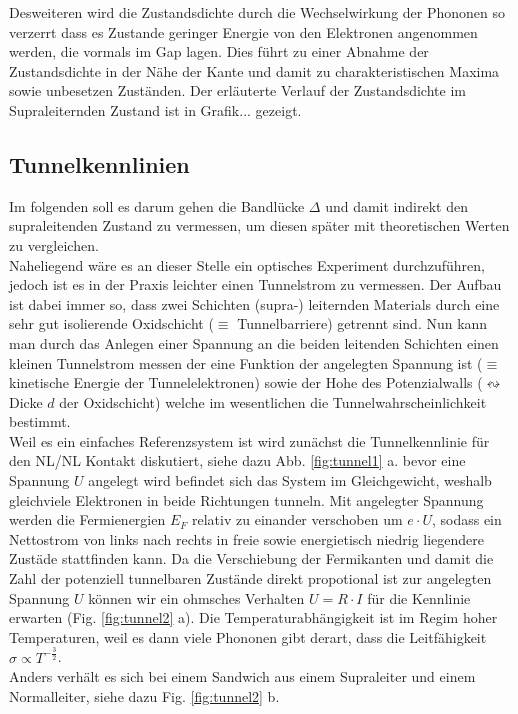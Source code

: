 \documentclass[twoside,        %
               BCOR12mm,       %
               english,ngerman, %
               fleqn,headsepline=false,footsepline=false
              ]{MFPREPORT}
\begin{document}
Desweiteren wird die Zustandsdichte durch die Wechselwirkung der Phononen so verzerrt dass es Zustande geringer Energie von den Elektronen angenommen werden, die vormals im Gap lagen. 
Dies führt zu einer Abnahme der Zustandsdichte in der Nähe der Kante und damit zu charakteristischen Maxima sowie unbesetzen Zuständen.
Der erläuterte Verlauf der Zustandsdichte im Supraleiternden Zustand ist in Grafik... gezeigt.

\subsection{Tunnelkennlinien}

Im folgenden soll es darum gehen die Bandlücke $\Delta$ und damit indirekt den supraleitenden Zustand zu vermessen, um diesen später mit theoretischen Werten zu vergleichen.
\\
Naheliegend wäre es an dieser Stelle ein optisches Experiment durchzuführen, jedoch ist es in der Praxis leichter einen Tunnelstrom zu vermessen.
Der Aufbau ist dabei immer so, dass zwei Schichten (supra-) leiternden Materials durch eine sehr gut isolierende Oxidschicht ($\equiv $ Tunnelbarriere) getrennt sind. 
Nun kann man durch das Anlegen einer Spannung an die beiden leitenden Schichten einen kleinen Tunnelstrom messen der eine Funktion der angelegten Spannung ist ($\equiv$ kinetische Energie der Tunnelelektronen) sowie der Hohe des Potenzialwalls ($\leftrightsquigarrow$ Dicke $d$ der Oxidschicht) welche im wesentlichen die Tunnelwahrscheinlichkeit bestimmt.
\\
Weil es ein einfaches Referenzsystem ist wird zunächst die Tunnelkennlinie für den NL/NL Kontakt diskutiert, siehe dazu Abb. \ref{fig:tunnel1} a.
bevor eine Spannung $U$ angelegt wird befindet sich das System im Gleichgewicht, weshalb gleichviele Elektronen in beide Richtungen tunneln.
Mit angelegter Spannung werden die Fermienergien $E_F$ relativ zu einander verschoben um $e \cdot U$, sodass ein Nettostrom von links nach rechts in freie sowie energietisch niedrig liegendere Zustäde stattfinden kann. 
Da die Verschiebung der Fermikanten und damit die Zahl der potenziell tunnelbaren Zustände direkt propotional ist zur angelegten Spannung $U$ können wir ein ohmsches Verhalten $U= R \cdot I$ für die Kennlinie erwarten (Fig. \ref{fig:tunnel2} a).
Die Temperaturabhängigkeit ist im Regim hoher Temperaturen, weil es dann viele Phononen gibt derart, dass die Leitfähigkeit $\sigma \propto T^{-\frac{3}{2}}$.
\\
Anders verhält es sich bei einem Sandwich aus einem Supraleiter und einem Normalleiter, siehe dazu Fig. \ref{fig:tunnel2} b.
\end{document}
